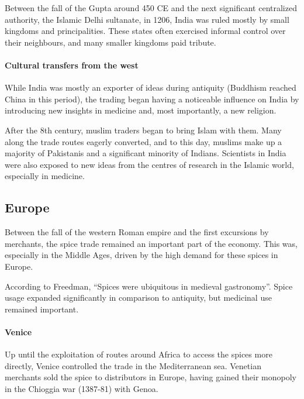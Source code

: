 \documentclass[11pt, a4paper, headings=standardclasses]{scrartcl}
\begin{document}
Between the fall of the Gupta around 450 CE\autocite[Section \textit{Gupta}]{India} and the next significant centralized authority, the Islamic Delhi sultanate, in 1206\autocite{Delhi}, India was ruled mostly by small kingdoms and principalities. These states often exercised informal control over their neighbours, and many smaller kingdoms paid tribute.\autocite{India}

\paragraph{Cultural transfers from the west}

While India was mostly an exporter of ideas during antiquity (Buddhism reached China in this period\autocite{SilkRoadIslam}), the trading began having a noticeable influence on India by introducing new insights in medicine and, most importantly, a new religion.

After the 8th century, muslim traders began to bring Islam with them.\autocite{SilkRoadIslam} Many along the trade routes eagerly converted, and to this day, muslims make up a majority of Pakistanis and a significant minority of Indians.\autocite{India} \label{Islam} Scientists in India were also exposed to new ideas from the centres of research in the Islamic world, especially in medicine.\autocite{medicine}

\subsection{Europe}

Between the fall of the western Roman empire and the first excursions by merchants, the spice trade remained an important part of the economy.\autocite{Yale} This was, especially in the Middle Ages, driven by the high demand for these spices in Europe. 

According to Freedman, ``Spices were ubiquitous in medieval gastronomy''.\autocite[3]{MST} Spice usage expanded significantly in comparison to antiquity, but medicinal use remained important.\autocite{RIS}

\paragraph{Venice}

Up until the exploitation of routes around Africa to access the spices more directly, Venice controlled the trade in the Mediterranean sea. Venetian merchants sold the spice to distributors in Europe, having gained their monopoly in the Chioggia war (1387-81) with Genoa.\autocite{SpiceTrade}
\end{document}
